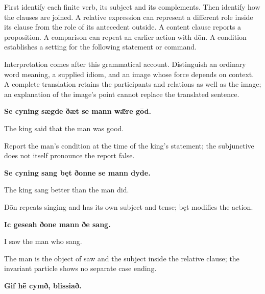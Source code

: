 First identify each finite verb, its subject and its complements. Then identify how the clauses are joined. A relative expression can represent a different role inside its clause from the role of its antecedent outside. A content clause reports a proposition. A comparison can repeat an earlier action with dōn. A condition establishes a setting for the following statement or command.

Interpretation comes after this grammatical account. Distinguish an ordinary word meaning, a supplied idiom, and an image whose force depends on context. A complete translation retains the participants and relations as well as the image; an explanation of the image’s point cannot replace the translated sentence.

\textbf{Se cyning sægde ðæt se mann wǣre gōd.}

The king said that the man was good.

Report the man’s condition at the time of the king’s statement; the subjunctive does not itself pronounce the report false.

\textbf{Se cyning sang bęt ðonne se mann dyde.}

The king sang better than the man did.

Dōn repeats singing and has its own subject and tense; bęt modifies the action.

\textbf{Ic geseah ðone mann ðe sang.}

I saw the man who sang.

The man is the object of saw and the subject inside the relative clause; the invariant particle shows no separate case ending.

\textbf{Gif hē cymð, blissiað.}


